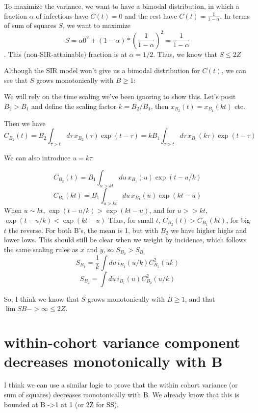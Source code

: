 \documentclass[12pt]{article}
\begin{document}
To maximize the variance, we want to have a bimodal distribution, in which a fraction $\alpha$ of infections have $C(t) = 0$ and the rest have $C(t) = \frac{1}{1-\alpha}$.
In terms of sum of squares $S$, we want to maximize
$$ S = \alpha 0^2 + (1-\alpha)*(\frac{1}{1-\alpha})^2 = \frac{1}{1-\alpha}$$.
This (non-SIR-attainable) fraction is at $\alpha = 1/2$.
Thus, we know that $S \leq 2Z$

Although the SIR model won't give us a bimodal distribution for $C(t)$, we can see that $S$ grows monotonically with $B \geq 1$:

We will rely on the time scaling we've been ignoring to show this. Let's posit $B_2>B_1$ and define the scaling factor
$k = B_2/B_1$, then
$x_{B_2}(t) = x_{B_1}(kt)$ etc.

Then we have
$$C_{B_2}(t) = B_2 \int_{\tau>t}{d\tau\, x_{B_2}(\tau) \exp(t-\tau)} = kB_1\int_{\tau>t}{d\tau\, x_{B_1}(k\tau) \exp(t-\tau)}$$

We can also introduce $u = k\tau$

$$C_{B_2}(t) = B_1 \int_{u>kt}{du\,x_{B_1}(u)\exp(t-u/k)}$$
$$C_{B_1}(kt) = B_1 \int_{u>kt}{du\,x_{B_1}(u)\exp(kt-u)}$$
When $u \sim kt$, $\exp(t-u/k) > \exp(kt-u)$, and for $u>>kt$, $\exp(t-u/k) < \exp(kt-u)$
Thus, for small $t$, $C_{B_2}(t)>C_{B_1}(kt)$, for big $t$ the reverse. For both B's, the mean is 1, but with $B_2$ we have higher highs and lower lows. This should still be clear when we weight by incidence, which follows the same scaling rules as $x$ and $y$, so $S_{B_2}>S_{B_1}$
$$S_{B_1} = \frac{1}{k}\int{du\, i_{B_1}(u/k) C^2_{B_1}(uk)}$$
$$S_{B_2}  = \int{du\, i_{B_1}(u) C^2_{B_2}(u/k)} $$

So, I think we know that $S$ grows monotonically with $B \geq 1$, and that $\lim{S} B-> \infty \leq 2Z$.

\section{within-cohort variance component decreases monotonically with B}
I think we can use a similar logic to prove that the within cohort variance (or sum of squares) decreases monotonically with B. We already know that this is bounded at B ->1 at 1 (or 2Z for SS).
\end{document}
